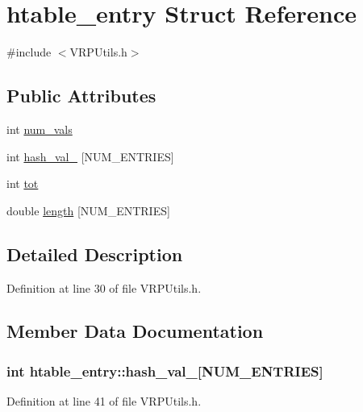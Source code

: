 \hypertarget{structhtable__entry}{
\section{htable\_\-entry Struct Reference}
\label{structhtable__entry}
}


{\ttfamily \#include $<$VRPUtils.h$>$}

\subsection*{Public Attributes}
\begin{DoxyCompactItemize}
\item 
int \hyperlink{structhtable__entry_a691d127bdbc4d9d881bc7a35fd5394b5}{num\_\-vals}
\item 
int \hyperlink{structhtable__entry_ae8f0309cd9fb5ec321b5d83d0d1f11f7}{hash\_\-val\_} \mbox{[}NUM\_\-ENTRIES\mbox{]}
\item 
int \hyperlink{structhtable__entry_aafae833bc59135f7185b753746e00fc0}{tot}
\item 
double \hyperlink{structhtable__entry_a6919b674abb5bf356a6438c3ee01d4a5}{length} \mbox{[}NUM\_\-ENTRIES\mbox{]}
\end{DoxyCompactItemize}


\subsection{Detailed Description}


Definition at line 30 of file VRPUtils.h.



\subsection{Member Data Documentation}
\hypertarget{structhtable__entry_ae8f0309cd9fb5ec321b5d83d0d1f11f7}{
\subsubsection[{hash\_\-val\_\-2}]{\setlength{\rightskip}{0pt plus 5cm}int {\bf htable\_\-entry::hash\_\-val\_}\mbox{[}NUM\_\-ENTRIES\mbox{]}}}
\label{structhtable__entry_ae8f0309cd9fb5ec321b5d83d0d1f11f7}


Definition at line 41 of file VRPUtils.h.

